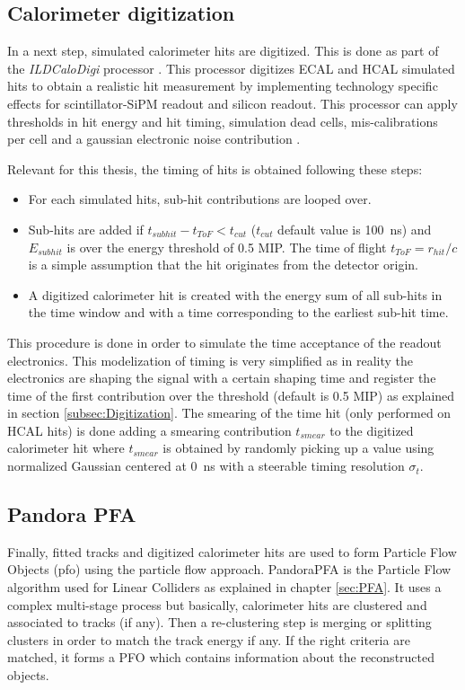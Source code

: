 \subsection{Calorimeter digitization}
\label{subsec:ILDDigiCalo}

In a next step, simulated calorimeter hits are digitized. This is done as part of the \textit{ILDCaloDigi} processor \cite{Jeans2015}. This \marlin processor digitizes ECAL and HCAL simulated hits to obtain a realistic hit measurement by implementing technology specific effects for scintillator-SiPM readout and silicon readout. This processor can apply thresholds in hit energy and hit timing, simulation dead cells, mis-calibrations per cell and a gaussian electronic noise contribution \cite{Hartbrich:2016bbz}.

Relevant for this thesis, the timing of hits is obtained following these steps:
\begin{itemize}
  \item For each simulated hits, sub-hit contributions are looped over.
  \item Sub-hits are added if $t_{subhit} - t_{ToF} < t_{cut}$ ($t_{cut}$ default value is \SI{100}{\ns}) and $E_{subhit}$ is over the energy threshold of 0.5 MIP. The time of flight $t_{ToF} = r_{hit} / c$ is a simple assumption that the hit originates from the detector origin.
  \item A digitized calorimeter hit is created with the energy sum of all sub-hits in the time window and with a time corresponding to the earliest sub-hit time.
\end{itemize}
This procedure is done in order to simulate the time acceptance of the readout electronics. This modelization of timing is very simplified as in reality the electronics are shaping the signal with a certain shaping time and register the time of the first contribution over the threshold (default is 0.5 MIP) as explained in section \ref{subsec:Digitization}. The smearing of the time hit (only performed on HCAL hits) is done adding a smearing contribution $t_{smear}$ to the digitized calorimeter hit where $t_{smear}$ is obtained by randomly picking up a value using normalized Gaussian centered at \SI{0}{\nano\second} with a steerable timing resolution $\sigma_{t}$.

\subsection{Pandora PFA}

Finally, fitted tracks and digitized calorimeter hits are used to form Particle Flow Objects (\acrshort{pfo}) using the particle flow approach. PandoraPFA \cite{Thomson:2009rp} is the Particle Flow algorithm used for Linear Colliders as explained in chapter \ref{sec:PFA}. It uses a complex multi-stage process but basically, calorimeter hits are clustered and associated to tracks (if any). Then a re-clustering step is merging or splitting clusters in order to match the track energy if any. If the right criteria are matched, it forms a PFO which contains information about the reconstructed objects.



